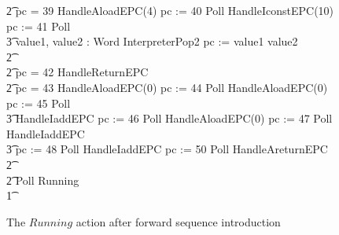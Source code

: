 \begin{figure}[t!]
{\begin{circus}
    \t2 {} \circelse pc = 39 \circthen HandleAloadEPC(4) \circseq pc := 40 \circseq Poll \circseq HandleIconstEPC(10) \circseq  pc := 41 \circseq Poll \circseq \\
    \t3 \circvar value1, value2 : Word \circspot InterpreterPop2 \circseq pc := \IF value1 \leq value2   \\
    \t2 {} \cdots {} \\
    \t2 {} \circelse pc = 42 \circthen HandleReturnEPC \\
    \t2 {} \circelse pc = 43 \circthen HandleAloadEPC(0) \circseq pc := 44 \circseq Poll \circseq HandleAloadEPC(0) \circseq pc := 45 \circseq Poll \circseq \\
    \t3 HandleIaddEPC \circseq pc := 46 \circseq Poll \circseq HandleAloadEPC(0) \circseq pc := 47 \circseq Poll \circseq  HandleIaddEPC \circseq \\
    \t3 pc := 48 \circseq Poll \circseq HandleIaddEPC \circseq pc := 50 \circseq Poll \circseq HandleAreturnEPC \\
    \t2 {} \cdots {} \\
    \t2 \circfi \circseq Poll \circseq Running \\
    \t1 \circfi
  \end{circus}
  }
  \caption{The $Running$ action after forward sequence introduction}
  \label{forward-sequence-introduction-example-figure}
\end{figure}

